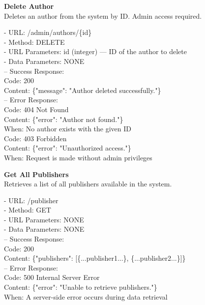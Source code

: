 \begin{flushleft}
    \textbf{Delete Author} \\
    Deletes an author from the system by ID. Admin access required.

    - URL: /admin/authors/\{id\} \\
    - Method: DELETE \\
    - URL Parameters: id (integer) — ID of the author to delete \\
    - Data Parameters: NONE \\
    – Success Response: \\
    Code: 200 \\
    Content: \{"message": "Author deleted successfully."\} \\
    – Error Response: \\
    Code: 404 Not Found \\
    Content: \{"error": "Author not found."\} \\
    When: No author exists with the given ID \\
    Code: 403 Forbidden \\
    Content: \{"error": "Unauthorized access."\} \\
    When: Request is made without admin privileges
\end{flushleft}

\begin{flushleft}
    \textbf{Get All Publishers} \\
    Retrieves a list of all publishers available in the system.

    - URL: /publisher \\
    - Method: GET \\
    - URL Parameters: NONE \\
    - Data Parameters: NONE \\
    – Success Response: \\
    Code: 200 \\
    Content: \{"publishers": [\{...publisher1...\}, \{...publisher2...\}]\} \\
    – Error Response: \\
    Code: 500 Internal Server Error \\
    Content: \{"error": "Unable to retrieve publishers."\} \\
    When: A server-side error occurs during data retrieval
\end{flushleft}

